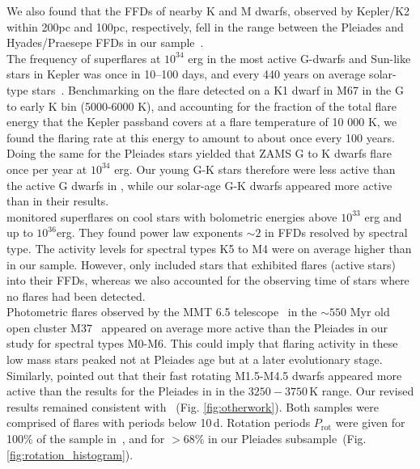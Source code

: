 \documentclass{aa}
\begin{document}
We also found that the FFDs of nearby K and M dwarfs, observed by Kepler/K2 within 200pc and 100pc, respectively, fell in the range between the Pleiades and Hyades/Praesepe FFDs in our sample~\citep{lin2019}.
\\
The frequency of superflares at $10^{34}$ erg in the most active G-dwarfs and Sun-like stars in Kepler was once in 10–100 days, and every 440 years on average solar-type stars~\citep{shibayama2013}. Benchmarking on the flare detected on a K1 dwarf in M67 in the G to early K bin (5000-6000 K), and accounting for the fraction of the total flare energy that the Kepler passband covers at a flare temperature of 10 000 K, we found the flaring rate at this energy to amount to about once every 100 years. Doing the same for the Pleiades stars yielded that ZAMS G to K dwarfs flare once per year at $10^{34}$ erg. Our young G-K stars therefore were less active than the active G dwarfs in \citet{shibayama2013}, while our solar-age G-K dwarfs appeared more active than in their results.
\\
\citet{howard2019} monitored superflares on cool stars with bolometric energies above $10^{33}$ erg and up to $10^{36}$erg. They found power law exponents $\sim 2$ in FFDs resolved by spectral type. The activity levels for spectral types K5 to M4 were on average higher than in our sample. However, \citet{howard2019} only included stars that exhibited flares (active stars) into their FFDs, whereas we also accounted for the observing time of stars where no flares had been detected.
\\
Photometric flares observed by the MMT 6.5 telescope~\citep{hartman2008} in the $\sim550$ Myr old open cluster M37~\citep{chang2015} appeared on average more active than the Pleiades in our study for spectral types M0-M6. This could imply that flaring activity in these low mass stars peaked not at Pleiades age but at a later evolutionary stage. 
\\
Similarly, \citet{raetz2020} pointed out that their fast rotating M1.5-M4.5 dwarfs appeared more active than the results for the Pleiades in  in the $3250-3750\,$K range. Our revised results remained consistent with ~(Fig. \ref{fig:otherwork}). Both samples were comprised of flares with periods below 10\,d. Rotation periods $P_\mathrm{rot}$ were given for 100\% of the sample in~\cite{raetz2020}, and for \mbox{$>68\%$} in our Pleiades subsample~(Fig. \ref{fig:rotation_histogram}). 
\\
\end{document}
